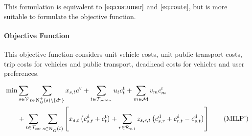 This formulation is equivalent to $\eqref{eq:costumer}$ and $\eqref{eq:route}$, but is more suitable to formulate the objective function.

\paragraph{Objective Function} \parfill

This objective function considers unit vehicle costs, unit public transport costs, trip costs for vehicles and public transport, deadhead costs for vehicles and user preferences.

\begin{align}
	\min & \sum_{s\in\mathcal{V}} \sum_{t\in\operatorname{N}_G^+(s)\backslash\{d^{\operatorname{e}}\}} x_{s,t}c^{\operatorname{v}} + \sum_{t\in\mathcal{T}_{\operatorname{public}}} u_t c_t^{\operatorname{t}} + \sum_{m\in\mathcal{M}} v_m c_m^{\operatorname{r}} \nonumber \\
	& + \sum_{t\in\mathcal{T}_{\operatorname{car}}} \sum_{s\in\operatorname{N}_G^-(t)} \left[x_{s,t}\left(c_{s,t}^{\operatorname{d}}+c_{t}^{\operatorname{t}}\right) + \sum_{r\in\mathcal{R}_{s,t}} z_{s,r,t}\left(c_{s,r}^{\operatorname{d}}+c_{r,t}^{\operatorname{d}}-c_{s,t}^{\operatorname{d}}\right)\right] \tag{MILP'} \label{eq:MILP_new}
\end{align}